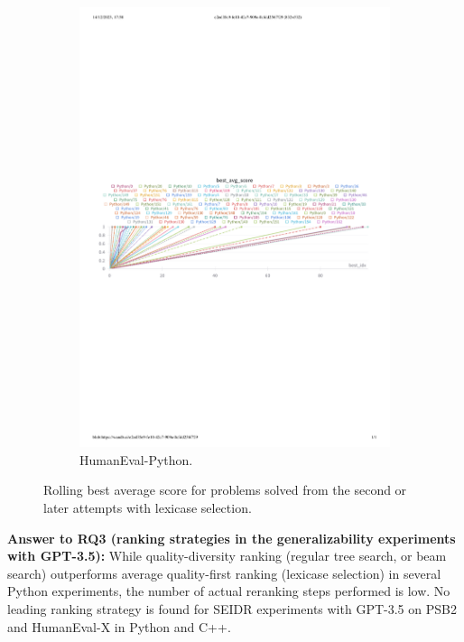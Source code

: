 \begin{figure}[H]
\begin{subfigure}{.94\textwidth}
\centering
\includegraphics[width=\linewidth, trim={0mm 110mm 0mm 147mm}, clip]{images/lexicase-humaneval-2.pdf}
  \caption{HumanEval-Python.}
  \label{fig:humaneval-score-lexicase}
\end{subfigure}
% 
\caption{Rolling best average score for problems solved from the second or later attempts with lexicase selection.}
\label{fig:avg-score-lexicase}
% 
\end{figure}



\begin{framed}
\noindent
\textbf{Answer to RQ3 (ranking strategies in the generalizability experiments with GPT-3.5): } 
While quality-diversity ranking (regular tree search, or beam search) outperforms average quality-first ranking (lexicase selection) in several Python experiments, the number of actual reranking steps performed is low. 
No leading ranking strategy is found for SEIDR experiments with GPT-3.5 on PSB2 and HumanEval-X in Python and C++.
\end{framed}


